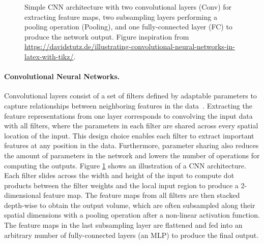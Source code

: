 


\begin{figure}[t]
	\centering
	\resizebox{0.95\textwidth}{!}{
		
	}
	\caption{Simple CNN architecture with two convolutional layers (Conv) for extracting feature maps, two subsampling layers performing a pooling operation (Pooling), and one fully-connected layer (FC) to produce the network output. Figure inspiration from \footnotesize{\url{https://davidstutz.de/illustrating-convolutional-neural-networks-in-latex-with-tikz/}}. }
	\label{fig:cnn_simple}
\end{figure}

\vspace{-3mm}
\paragraph{Convolutional Neural Networks.} 
Convolutional layers consist of a set of filters defined by adaptable parameters to capture relationships between neighboring features in the data~\cite{lecun1998gradient}. %
Extracting the feature representations from one layer corresponds to convolving the input data with all filters, where the parameters in each filter are shared across every spatial location of the input. 
This design choice enables each filter to extract important features at any position in the data. Furthermore, parameter sharing also reduces the amount of parameters in the network and lowers the number of operations for computing the outputs. Figure \ref{fig:cnn_simple} shows an illustration of a CNN architecture. Each filter slides across the width and height of the input to compute dot products between the filter weights and the local input region to produce a 2-dimensional feature map. The feature maps from all filters are then stacked depth-wise to obtain the output volume, which are often subsampled along their spatial dimensions with a pooling operation after a non-linear activation function. The feature maps in the last subsampling layer are flattened and fed into an arbitrary number of fully-connected layers (an MLP) to produce the final output. 


